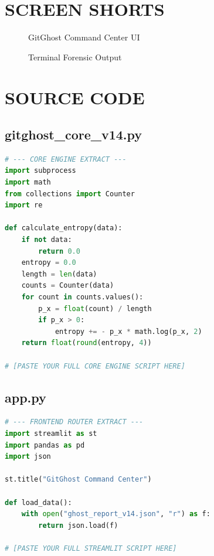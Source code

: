\documentclass[12pt, a4paper, oneside]{report}
\begin{document}
\section{SCREEN SHORTS}

\begin{figure}[H]
    \centering
    \caption{GitGhost Command Center UI}
\end{figure}

\begin{figure}[H]
    \centering
    \caption{Terminal Forensic Output}
\end{figure}

\section{SOURCE CODE}

\subsection{gitghost\_core\_v14.py}
\begin{lstlisting}[language=Python]
# --- CORE ENGINE EXTRACT ---
import subprocess
import math
from collections import Counter
import re

def calculate_entropy(data):
    if not data:
        return 0.0
    entropy = 0.0
    length = len(data)
    counts = Counter(data)
    for count in counts.values():
        p_x = float(count) / length
        if p_x > 0:
            entropy += - p_x * math.log(p_x, 2)
    return float(round(entropy, 4))
    
# [PASTE YOUR FULL CORE ENGINE SCRIPT HERE]
\end{lstlisting}

\subsection{app.py}
\begin{lstlisting}[language=Python]
# --- FRONTEND ROUTER EXTRACT ---
import streamlit as st
import pandas as pd
import json

st.title("GitGhost Command Center")

def load_data():
    with open("ghost_report_v14.json", "r") as f:
        return json.load(f)

# [PASTE YOUR FULL STREAMLIT SCRIPT HERE]
\end{lstlisting}
\end{document}

